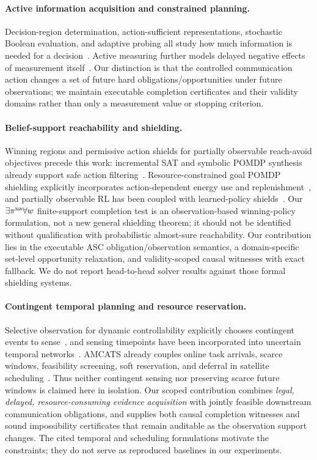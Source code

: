 \documentclass[conference]{IEEEtran}
\begin{document}
\paragraph{Active information acquisition and constrained planning.}
Decision-region determination, action-sufficient representations, stochastic Boolean evaluation, and adaptive probing all study how much information is needed for a decision~\cite{javdani2014drd,huang2022asr,deshpande2013sbfe,hellerstein2022adaptivity}. Active measuring further models delayed negative effects of measurement itself~\cite{gao2026activemeasuring}. Our distinction is that the controlled communication action changes a set of future hard obligations/opportunities under future observations; we maintain executable completion certificates and their validity domains rather than only a measurement value or stopping criterion.

\paragraph{Belief-support reachability and shielding.}
Winning regions and permissive action shields for partially observable reach-avoid objectives precede this work: incremental SAT and symbolic POMDP synthesis already support safe action filtering~\cite{junges2021reachability}. Resource-constrained goal POMDP shielding explicitly incorporates action-dependent energy use and replenishment~\cite{ajdarow2023rsgoshield}, and partially observable RL has been coupled with learned-policy shields~\cite{carr2023partialshield}. Our $\exists\pi^{\rm na}\forall w$ finite-support completion test is an observation-based winning-policy formulation, not a new general shielding theorem; it should not be identified without qualification with probabilistic almost-sure reachability. Our contribution lies in the executable ASC obligation/observation semantics, a domain-specific set-level opportunity relaxation, and validity-scoped causal witnesses with exact fallback. We do not report head-to-head solver results against those formal shielding systems.

\paragraph{Contingent temporal planning and resource reservation.}
Selective observation for dynamic controllability explicitly chooses contingent events to sense~\cite{bitmonnot2016contingentobserve}, and sensing timepoints have been incorporated into uncertain temporal networks~\cite{cheng2026stnust}. AMCATS already couples online task arrivals, scarce windows, feasibility screening, soft reservation, and deferral in satellite scheduling~\cite{lei2026amcats}. Thus neither contingent sensing nor preserving scarce future windows is claimed here in isolation. Our scoped contribution combines \emph{legal, delayed, resource-consuming evidence acquisition} with jointly feasible downstream communication obligations, and supplies both causal completion witnesses and sound impossibility certificates that remain auditable as the observation support changes. The cited temporal and scheduling formulations motivate the constraints; they do not serve as reproduced baselines in our experiments.
\end{document}
